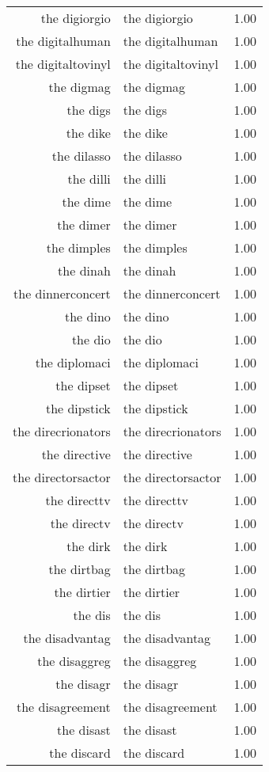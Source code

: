 \begin{table}[ht]
\begin{tabular}{rlr}
  the digiorgio & the digiorgio & 1.00 \\ 
  the digitalhuman & the digitalhuman & 1.00 \\ 
  the digitaltovinyl & the digitaltovinyl & 1.00 \\ 
  the digmag & the digmag & 1.00 \\ 
  the digs & the digs & 1.00 \\ 
  the dike & the dike & 1.00 \\ 
  the dilasso & the dilasso & 1.00 \\ 
  the dilli & the dilli & 1.00 \\ 
  the dime & the dime & 1.00 \\ 
  the dimer & the dimer & 1.00 \\ 
  the dimples & the dimples & 1.00 \\ 
  the dinah & the dinah & 1.00 \\ 
  the dinnerconcert & the dinnerconcert & 1.00 \\ 
  the dino & the dino & 1.00 \\ 
  the dio & the dio & 1.00 \\ 
  the diplomaci & the diplomaci & 1.00 \\ 
  the dipset & the dipset & 1.00 \\ 
  the dipstick & the dipstick & 1.00 \\ 
  the direcrionators & the direcrionators & 1.00 \\ 
  the directive & the directive & 1.00 \\ 
  the directorsactor & the directorsactor & 1.00 \\ 
  the directtv & the directtv & 1.00 \\ 
  the directv & the directv & 1.00 \\ 
  the dirk & the dirk & 1.00 \\ 
  the dirtbag & the dirtbag & 1.00 \\ 
  the dirtier & the dirtier & 1.00 \\ 
  the dis & the dis & 1.00 \\ 
  the disadvantag & the disadvantag & 1.00 \\ 
  the disaggreg & the disaggreg & 1.00 \\ 
  the disagr & the disagr & 1.00 \\ 
  the disagreement & the disagreement & 1.00 \\ 
  the disast & the disast & 1.00 \\ 
  the discard & the discard & 1.00 \\ 

\end{tabular}
\end{table}
